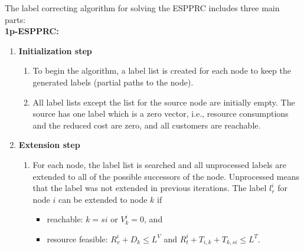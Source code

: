 

The label correcting algorithm for solving the ESPPRC includes three main parts: \\
{\bf 1p-ESPPRC:}
\begin{enumerate}
\item {\bf Initialization step} 
  \begin{enumerate}
  \item To begin the algorithm, a label list is created 
    for each node to keep the generated labels (partial paths to the node). 
  \item %
    All label lists except the list for the source node are initially empty. 
    The source has one label which is a zero vector, i.e., resource consumptions 
    and the reduced cost  are zero, and all customers are reachable.
  \end{enumerate}
\item {\bf Extension step} 
  \begin{enumerate}
  \item For each node, the label list is searched and all unprocessed labels 
    are extended to all of the possible successors of the node. Unprocessed means 
    that the label was not extended in previous iterations. 
    The label $l^i_r$ for node $i$ can be extended to node $k$ if 
    \begin{itemize}
    \item[i.] reachable: $k = si$ or $V^i_k = 0$, and
    \item[ii.] resource feasible: $R^i_{v} + D_k \leq L^V$ and 
      $R^i_{t} + T_{i,k} + T_{k,si} \leq L^T$.

\end{itemize}
\end{enumerate}
\end{enumerate}
